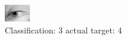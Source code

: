 \begin{figure}[h!]
\begin{center}
\includegraphics[width=0.60\columnwidth]{figures/ID2982_class_3_target_4.png}
\end{center}
\caption{ Classification: 3 actual target: 4}
\label{fig:ID2982_class_3_target_4}
\end{figure}
